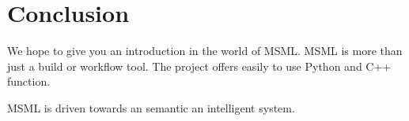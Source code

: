 \section{Conclusion}
\label{sec:conclusion}

We hope to give you an introduction in the world of MSML.
MSML is more than just a build or workflow tool. The project offers
easily to use Python and C++ function.

MSML is driven towards an semantic an intelligent system.
